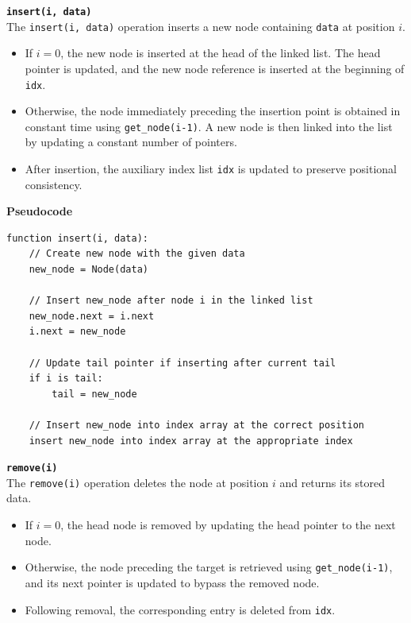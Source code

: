 \documentclass[12pt]{article}
\begin{document}
\noindent\textbf{\texttt{insert(i, data)}}\\

The \texttt{insert(i, data)} operation inserts a new node containing \texttt{data} at position $i$.
\begin{itemize}
    \item If $i = 0$, the new node is inserted at the head of the linked list. The head pointer is updated, and the new node reference is inserted at the beginning of \texttt{idx}.
    \item Otherwise, the node immediately preceding the insertion point is obtained in constant time using \texttt{get\_node(i-1)}. A new node is then linked into the list by updating a constant number of pointers\parencite{GeeksforGeeks_SinglyLinkedListTutorial_2026,Tulusibrahim_MasteringSinglyLinkedList_2023}.
    \item After insertion, the auxiliary index list \texttt{idx} is updated to preserve positional consistency.
\end{itemize}

\textbf{Pseudocode}

\begin{lstlisting}
function insert(i, data):
    // Create new node with the given data
    new_node = Node(data)

    // Insert new_node after node i in the linked list
    new_node.next = i.next
    i.next = new_node

    // Update tail pointer if inserting after current tail
    if i is tail:
        tail = new_node

    // Insert new_node into index array at the correct position
    insert new_node into index array at the appropriate index
\end{lstlisting}

\noindent\textbf{\texttt{remove(i)}}\\

The \texttt{remove(i)} operation deletes the node at position $i$ and returns its stored data.
\begin{itemize}
    \item If $i = 0$, the head node is removed by updating the head pointer to the next node.
    \item Otherwise, the node preceding the target is retrieved using \texttt{get\_node(i-1)}, and its next pointer is updated to bypass the removed node\parencite{GeeksforGeeks_SinglyLinkedListTutorial_2026,Tulusibrahim_MasteringSinglyLinkedList_2023}.
    \item Following removal, the corresponding entry is deleted from \texttt{idx}.
\end{itemize}
\end{document}
